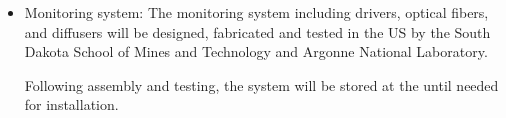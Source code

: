 \begin{itemize}
\item Monitoring system: The monitoring system including  drivers, optical fibers, and diffusers will be designed, fabricated and tested in the US by the South Dakota School of Mines and Technology and Argonne National Laboratory. 

Following assembly and testing, the system will be stored at the  until needed for installation.



\end{itemize}

